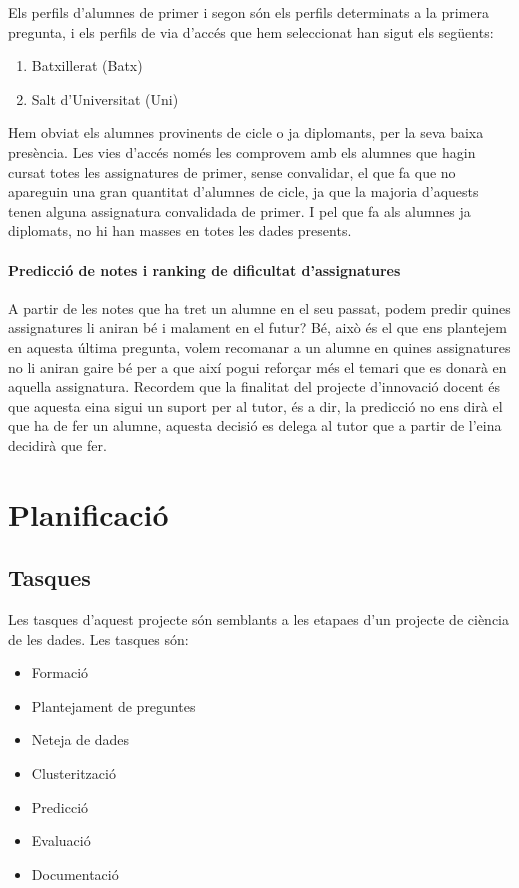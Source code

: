 \documentclass[12pt,a4paper,catalan]{article}
\begin{document}
Els perfils d'alumnes de primer i segon són els perfils determinats a la primera pregunta, i els perfils de via d'accés que hem seleccionat han sigut els següents:
\begin{enumerate}
	\item Batxillerat (Batx)
	\item Salt d'Universitat (Uni)
\end{enumerate}

Hem obviat els alumnes provinents de cicle o ja diplomants, per la seva baixa presència. Les vies d'accés només les comprovem amb els alumnes que hagin cursat totes les assignatures de primer, sense convalidar, el que fa que no apareguin una gran quantitat d'alumnes de cicle, ja que la majoria d'aquests tenen alguna assignatura convalidada de primer. I pel que fa als alumnes ja diplomats, no hi han masses en totes les dades presents.

\paragraph{Predicció de notes i ranking de dificultat d'assignatures}
A partir de les notes que ha tret un alumne en el seu passat, podem predir quines assignatures li aniran bé i malament en el futur? Bé, això és el que ens plantejem en aquesta última pregunta, volem recomanar a un alumne en quines assignatures no li aniran gaire bé per a que així pogui reforçar més el temari que es donarà en aquella assignatura. Recordem que la finalitat del projecte d'innovació docent és que aquesta eina sigui un suport per al tutor, és a dir, la predicció no ens dirà el que ha de fer un alumne, aquesta decisió es delega al tutor que a partir de l'eina decidirà que fer.
\newpage

\section{Planificació}
\subsection{Tasques}
Les tasques d'aquest projecte són semblants a les etapaes d'un projecte de ciència de les dades. Les tasques són:
\begin{itemize}[leftmargin=.5in]
	\item Formació
	\item Plantejament de preguntes
	\item Neteja de dades
	\item Clusterització
	\item Predicció
	\item Evaluació
	\item Documentació
\end{itemize}
\end{document}
